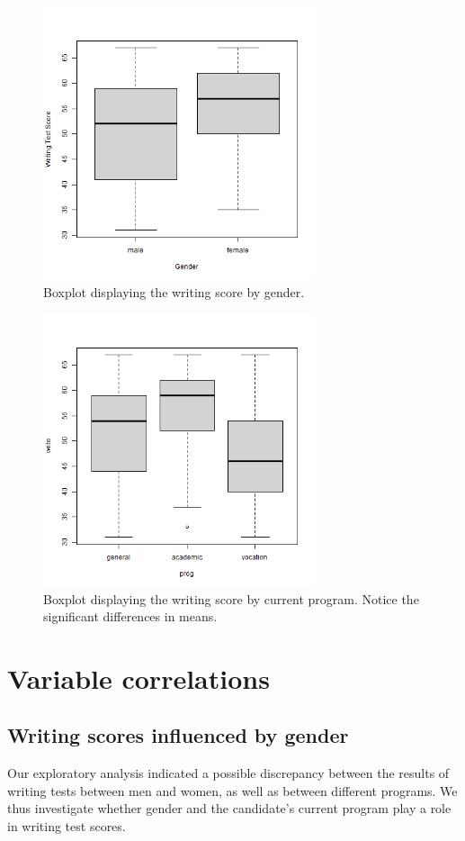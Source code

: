 \documentclass[10pt, a4paper]{article}
\begin{document}
	\begin{figure}
		\includegraphics[width=8cm]{write_genre_boxplot.png}
		\centering
		\caption{Boxplot displaying the writing score by gender.}
		\label{fig::write_gender}
	\end{figure}
	
	\begin{figure}
		\includegraphics[width=8cm]{write_prog_boxplot.png}
		\centering
		\caption{Boxplot displaying the writing score by current program. Notice the significant differences in means.}
		\label{fig::write_prog}
	\end{figure}
	
	\section{Variable correlations}
	\label{sec::var_cors}
	
	\subsection{Writing scores influenced by gender}
	Our exploratory analysis indicated a possible discrepancy between the results of writing tests between men and women, as well as between different programs. We thus investigate whether gender and the candidate's current program play a role in writing test scores.
	
\end{document}
